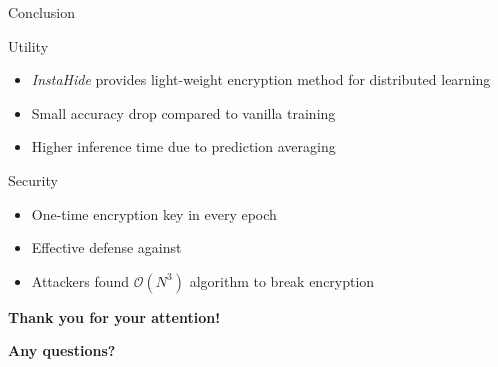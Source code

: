 \documentclass[xcolor=table]{beamer} %
\begin{document}
\begin{frame}{Conclusion}
    \begin{block}{Utility}
        \begin{itemize}[<+->]
            \item \textit{InstaHide} provides light-weight encryption method for distributed learning
            \item Small accuracy drop compared to vanilla training
            \item Higher inference time due to prediction averaging
        \end{itemize}
    \end{block}
    \vspace{1em}
    \pause
    \begin{block}{Security}
        \begin{itemize}[<+->]
            \item One-time encryption key in every epoch
            \item Effective defense against 
            \item Attackers found $\mathcal{O}(N^3)$ algorithm to break encryption
        \end{itemize}
    \end{block}
\end{frame}

\begin{frame}

    \centering

    \LARGE \textbf{Thank you for your attention!}


    \large \textbf{Any questions?}

\end{frame}

\begin{frame}
    \printbibliography
\end{frame}
\end{document}
